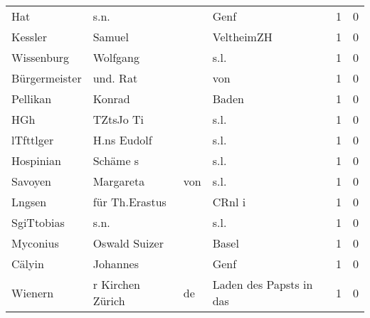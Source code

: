 \documentclass[10pt,a4paper,landscape]{article}
\begin{document}
\begin{longtable}{llllrr}
                      Hat &                               s.n. &             &                                        Genf &          1 &         0 \\
                  Kessler &                             Samuel &             &                                  VeltheimZH &          1 &         0 \\
               Wissenburg &                           Wolfgang &             &                                        s.l. &          1 &         0 \\
            Bürgermeister &                           und. Rat &             &                                         von &          1 &         0 \\
                 Pellikan &                             Konrad &             &                                       Baden &          1 &         0 \\
                      HGh &                          TZtsJo Ti &             &                                        s.l. &          1 &         0 \\
                lTfttlger &                        H.ns Eudolf &             &                                        s.l. &          1 &         0 \\
                Hospinian &                           Schäme s &             &                                        s.l. &          1 &         0 \\
                  Savoyen &                          Margareta &         von &                                        s.l. &          1 &         0 \\
                   Lngsen &                     für Th.Erastus &             &                                      CRnl i &          1 &         0 \\
               SgiTtobias &                               s.n. &             &                                        s.l. &          1 &         0 \\
                 Myconius &                      Oswald Suizer &             &                                       Basel &          1 &         0 \\
                   Cälyin &                           Johannes &             &                                        Genf &          1 &         0 \\
                  Wienern &                   r Kirchen Zürich &          de &                     Laden des Papsts in das &          1 &         0 \\

\end{longtable}
\end{document}
